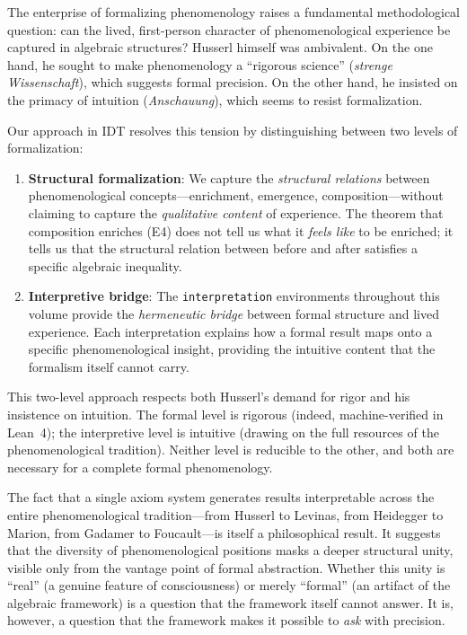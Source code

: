 \begin{interpretation}
\label{interp:formal-phenom-status}
The enterprise of formalizing phenomenology raises a fundamental methodological
question: can the lived, first-person character of phenomenological experience
be captured in algebraic structures?  Husserl himself was ambivalent.  On the
one hand, he sought to make phenomenology a ``rigorous science''
(\textit{strenge Wissenschaft}), which suggests formal precision.  On the other
hand, he insisted on the primacy of intuition (\textit{Anschauung}), which seems
to resist formalization.

Our approach in IDT resolves this tension by distinguishing between two levels
of formalization:

\begin{enumerate}
\item \textbf{Structural formalization}: We capture the \emph{structural
relations} between phenomenological concepts---enrichment, emergence,
composition---without claiming to capture the \emph{qualitative content} of
experience.  The theorem that composition enriches (E4) does not tell us
what it \emph{feels like} to be enriched; it tells us that the structural
relation between before and after satisfies a specific algebraic inequality.

\item \textbf{Interpretive bridge}: The \texttt{interpretation} environments
throughout this volume provide the \emph{hermeneutic bridge} between formal
structure and lived experience.  Each interpretation explains how a formal
result maps onto a specific phenomenological insight, providing the intuitive
content that the formalism itself cannot carry.
\end{enumerate}

This two-level approach respects both Husserl's demand for rigor and his
insistence on intuition.  The formal level is rigorous (indeed, machine-verified
in Lean~4); the interpretive level is intuitive (drawing on the full resources
of the phenomenological tradition).  Neither level is reducible to the other,
and both are necessary for a complete formal phenomenology.

The fact that a single axiom system generates results interpretable across the
entire phenomenological tradition---from Husserl to Levinas, from Heidegger to
Marion, from Gadamer to Foucault---is itself a philosophical result.  It
suggests that the diversity of phenomenological positions masks a deeper
structural unity, visible only from the vantage point of formal abstraction.
Whether this unity is ``real'' (a genuine feature of consciousness) or merely
``formal'' (an artifact of the algebraic framework) is a question that the
framework itself cannot answer.  It is, however, a question that the framework
makes it possible to \emph{ask} with precision.
\end{interpretation}

